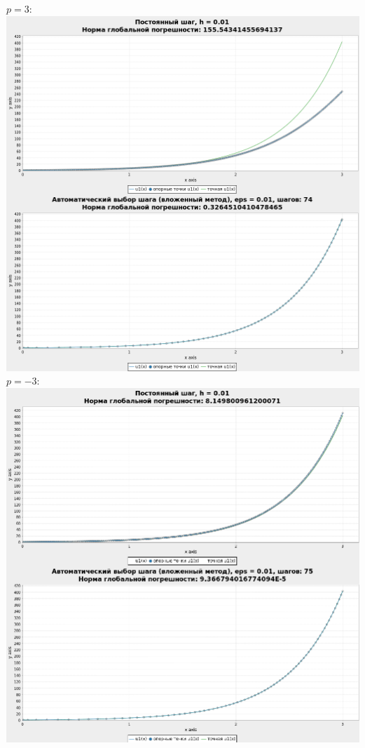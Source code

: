 \documentclass[a4paper,12pt]{article}
\begin{document}
\begin{flushleft}
\begin{enumerate}
      $p = 3:$\linebreak\linebreak\includegraphics{xp3.png}\linebreak\linebreak
      $p = -3:$\linebreak\linebreak\includegraphics{xpm3.png}\linebreak\linebreak

\end{enumerate}
\end{flushleft}
\end{document}
